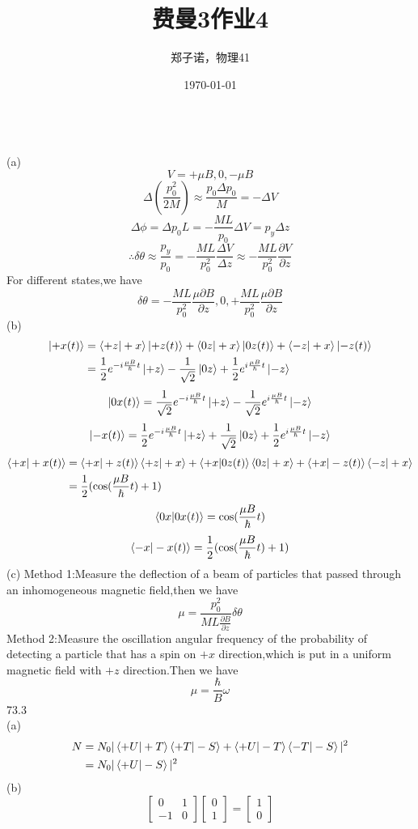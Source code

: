 \documentclass[utf8]{ctexart}
\title{费曼3作业4}
\author{郑子诺，物理41}
\date{\today}
\begin{document}
\\
(a)
\[V=+\mu B,0,-\mu B\]
\[\Delta(\frac{p_0^2}{2M})\approx\frac{p_0\Delta p_0}{M}=-\Delta V\]
\[\Delta\phi=\Delta p_0L=-\frac{ML}{p_0}\Delta V=p_y\Delta z\]
\[\therefore \delta\theta\approx\frac{p_y}{p_0}=-\frac{ML}{p_0^2}\frac{\Delta V}{\Delta z}\approx-\frac{ML}{p_0^2}\frac{\partial V}{\partial z}\]
For different states,we have
\[\delta\theta=-\frac{ML}{p_0^2}\frac{\mu\partial B}{\partial z},0,+\frac{ML}{p_0^2}\frac{\mu\partial B}{\partial z}\]
(b)
\begin{align}
	\ket{+x(t)}&=\braket{+z|+x}\ket{+z(t)}+\braket{0z|+x}\ket{0z(t)}+\braket{-z|+x}\ket{-z(t)}\notag\\
	&=\frac{1}{2}e^{-i\frac{\mu B}{\hbar}t}\ket{+z}-\frac{1}{\sqrt{2}}\ket{0z}+\frac{1}{2}e^{i\frac{\mu B}{\hbar}t}\ket{-z}\notag
\end{align}
\[\ket{0x(t)}=\frac{1}{\sqrt{2}}e^{-i\frac{\mu B}{\hbar}t}\ket{+z}-\frac{1}{\sqrt{2}}e^{i\frac{\mu B}{\hbar}t}\ket{-z}\]
\[\ket{-x(t)}=\frac{1}{2}e^{-i\frac{\mu B}{\hbar}t}\ket{+z}+\frac{1}{\sqrt{2}}\ket{0z}+\frac{1}{2}e^{i\frac{\mu B}{\hbar}t}\ket{-z}\]
\begin{align}
	\braket{+x|+x(t)}&=\braket{+x|+z(t)}\braket{+z|+x}+\braket{+x|0z(t)}\braket{0z|+x}+\braket{+x|-z(t)}\braket{-z|+x}\notag\\
	&=\frac{1}{2}(\cos(\frac{\mu B}{\hbar}t)+1)\notag
\end{align}
\[\braket{0x|0x(t)}=\cos(\frac{\mu B}{\hbar}t)\]
\[\braket{-x|-x(t)}=\frac{1}{2}(\cos(\frac{\mu B}{\hbar}t)+1)\]
(c)
Method 1:Measure the deflection of a beam of particles that passed through an inhomogeneous magnetic field,then we have
\[\mu=\frac{p_0^2}{ML\frac{\partial B}{\partial z}}\delta\theta\]
Method 2:Measure the oscillation angular frequency of the probability of detecting a particle that has a spin on $+x$ direction,which is put in a uniform magnetic field with $+z$ direction.Then we have
\[\mu=\frac{\hbar}{B}\omega\]
73.3\\
(a)
\begin{align*}
	N&=N_0|\braket{+U|+T}\braket{+T|-S}+\braket{+U|-T}\braket{-T|-S}|^2\\
	&=N_0|\braket{+U|-S}|^2
\end{align*}
(b)
\[\begin{bmatrix}
	0&1\\
	-1&0
\end{bmatrix}
\begin{bmatrix}
	0\\
	1
\end{bmatrix}
=
\begin{bmatrix}
	1\\
	0
\end{bmatrix}\]
\end{document}
